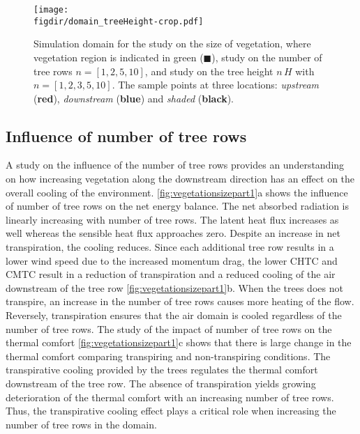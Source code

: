 	\begin{figure}[p]
		\centering
		\texttt{[image: \\figdir/domain\_treeHeight-crop.pdf]}
		\caption{Simulation domain for the study on the size of vegetation, where vegetation region is indicated in green ({\color{flatuidarkgreen}$\blacksquare$}),  study on the number of tree rows $n=[1,2,5,10]$, and  study on the tree height $n\,H$ with $n=[1,2,3,5,10]$. The sample points at three locations: \textit{upstream} ({\color{flatuidarkred}\textbf{red}}), \textit{downstream} ({\color{flatuidarkblue}\textbf{blue}}) and \textit{shaded} (\textbf{black}).}
		\label{fig:domainvegsize}
	\end{figure}

\subsection{Influence of number of tree rows}

A study on the influence of the number of tree rows provides an understanding on how increasing vegetation along the downstream direction has an effect on the overall cooling of the environment. \cref{fig:vegetationsizepart1}a shows the influence of number of tree rows on the net energy balance. The net absorbed radiation is linearly increasing with number of tree rows. The latent heat flux increases as well whereas the sensible heat flux approaches zero. Despite an increase in net transpiration, the cooling reduces. Since each additional tree row results in a lower wind speed due to the increased momentum drag, the lower CHTC and CMTC result in a reduction of transpiration and a reduced cooling of the air downstream of the tree row \cref{fig:vegetationsizepart1}b. When the trees does not transpire, an increase in the number of tree rows causes more heating of the flow. Reversely, transpiration ensures that the air domain is cooled regardless of the number of tree rows. The study of the impact of number of tree rows on the thermal comfort \cref{fig:vegetationsizepart1}c shows that there is large change in the thermal comfort comparing transpiring and non-transpiring conditions. The transpirative cooling provided by the trees regulates the thermal comfort downstream of the tree row. The absence of transpiration yields growing deterioration of the thermal comfort with an increasing number of tree rows. Thus, the transpirative cooling effect plays a critical role when increasing the number of tree rows in the domain. 

